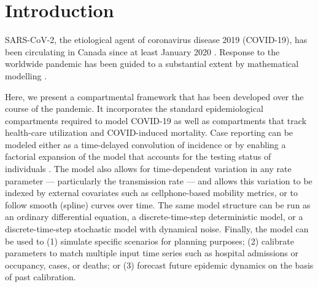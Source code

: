 \documentclass[12pt]{article}\usepackage[]{graphicx}\usepackage[]{color}
\begin{document}

\tableofcontents




\section{Introduction}

SARS-CoV-2, the
etiological agent of coronavirus disease 2019 (COVID-19), has been
circulating in Canada since at least January 2020 \cite{onpr_200125}.
Response to the worldwide pandemic \cite{Li+20,Fauc+20} has been
guided to a substantial extent by mathematical modelling
\cite{Flax+20}.


Here, we present a compartmental framework that has been developed
over the course of the pandemic. It incorporates the standard epidemiological compartments
required to model COVID-19 as well as compartments that track health-care utilization and COVID-induced
mortality. Case reporting can be modeled either as a time-delayed convolution
of incidence or by enabling a factorial expansion of the model that accounts
for the testing status of individuals \cite{Fris+20}. The model also allows
for time-dependent variation in any rate parameter --- particularly the transmission rate --- and
allows this variation to be indexed by external covariates such as cellphone-based mobility
metrics, or to follow smooth (spline) curves over time. The same model structure can be
run as an ordinary differential equation,
a discrete-time-step deterministic model, or
a discrete-time-step stochastic model with dynamical noise.
Finally, the model can be used to
(1) simulate specific scenarios for planning purposes; 
(2) calibrate parameters to match multiple input time series such as hospital admissions or occupancy, cases, or deaths; or
(3) forecast future epidemic dynamics on the basis of past calibration.
\end{document}
